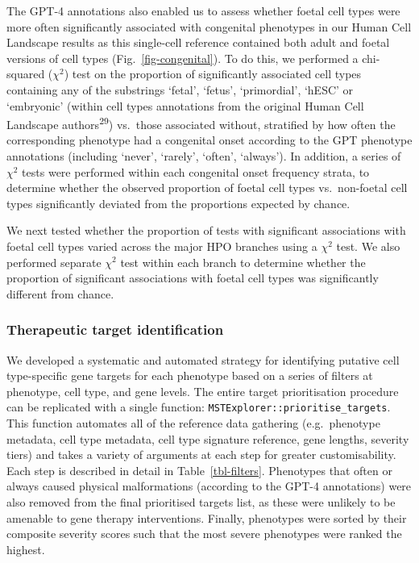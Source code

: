 \documentclass[
]{article}
\begin{document}
The GPT-4 annotations also enabled us to assess whether foetal cell
types were more often significantly associated with congenital
phenotypes in our Human Cell Landscape results as this single-cell
reference contained both adult and foetal versions of cell types
(Fig.~\ref{fig-congenital}). To do this, we performed a chi-squared
(\(\chi^2\)) test on the proportion of significantly associated cell
types containing any of the substrings `fetal', `fetus', `primordial',
`hESC' or `embryonic' (within cell types annotations from the original
Human Cell Landscape authors\textsuperscript{29}) vs.~those associated
without, stratified by how often the corresponding phenotype had a
congenital onset according to the GPT phenotype annotations (including
`never', `rarely', `often', `always'). In addition, a series of
\(\chi^2\) tests were performed within each congenital onset frequency
strata, to determine whether the observed proportion of foetal cell
types vs.~non-foetal cell types significantly deviated from the
proportions expected by chance.

We next tested whether the proportion of tests with significant
associations with foetal cell types varied across the major HPO branches
using a \(\chi^2\) test. We also performed separate \(\chi^2\) test
within each branch to determine whether the proportion of significant
associations with foetal cell types was significantly different from
chance.

\subsubsection{Therapeutic target
identification}\label{therapeutic-target-identification-1}

We developed a systematic and automated strategy for identifying
putative cell type-specific gene targets for each phenotype based on a
series of filters at phenotype, cell type, and gene levels. The entire
target prioritisation procedure can be replicated with a single
function: \texttt{MSTExplorer::prioritise\_targets}. This function
automates all of the reference data gathering (e.g.~phenotype metadata,
cell type metadata, cell type signature reference, gene lengths,
severity tiers) and takes a variety of arguments at each step for
greater customisability. Each step is described in detail in
Table~\ref{tbl-filters}. Phenotypes that often or always caused physical
malformations (according to the GPT-4 annotations) were also removed
from the final prioritised targets list, as these were unlikely to be
amenable to gene therapy interventions. Finally, phenotypes were sorted
by their composite severity scores such that the most severe phenotypes
were ranked the highest.
\end{document}
